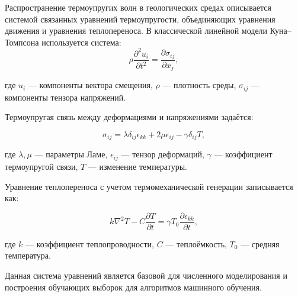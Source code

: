 Распространение термоупругих волн в геологических средах описывается системой связанных уравнений термоупругости, объединяющих уравнения движения и уравнения теплопереноса. В классической линейной модели Куна–Томпсона используется система:
\begin{equation}
\rho \frac{\partial^2 u_i}{\partial t^2} = \frac{\partial \sigma_{ij}}{\partial x_j},
\label{eq:motion}
\end{equation}

где $u_i$ — компоненты вектора смещения, $\rho$ — плотность среды, $\sigma_{ij}$ — компоненты тензора напряжений.

Термоупругая связь между деформациями и напряжениями задаётся:

\begin{equation}
\sigma_{ij} = \lambda \delta_{ij} \epsilon_{kk} + 2\mu \epsilon_{ij} - \gamma \delta_{ij} T,
\label{eq:stress}
\end{equation}

где $\lambda, \mu$ — параметры Ламе, $\epsilon_{ij}$ — тензор деформаций, $\gamma$ — коэффициент термоупругой связи, $T$ — изменение температуры.

Уравнение теплопереноса с учетом термомеханической генерации записывается как:

\begin{equation}
k \nabla^2 T - C \frac{\partial T}{\partial t} = \gamma T_0 \frac{\partial \epsilon_{kk}}{\partial t},
\label{eq:heat}
\end{equation}

где $k$ — коэффициент теплопроводности, $C$ — теплоёмкость, $T_0$ — средняя температура.

Данная система уравнений является базовой для численного моделирования и построения обучающих выборок для алгоритмов машинного обучения.